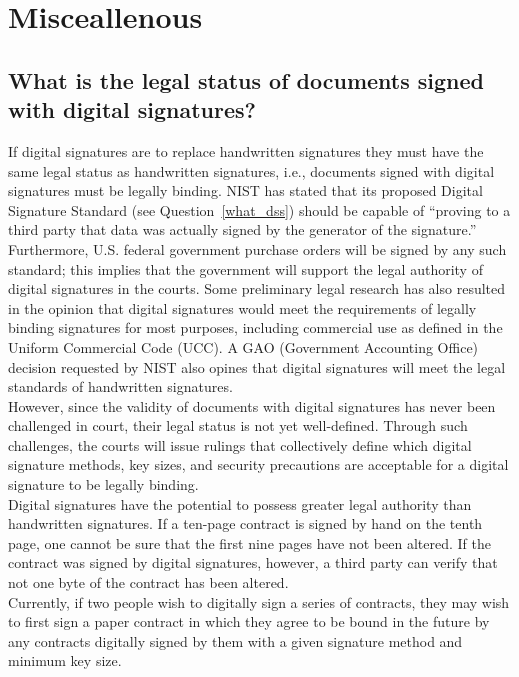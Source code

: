\section{Misceallenous}

\subsection{What is the legal status of documents signed with digital
signatures?}

If digital signatures are to replace handwritten signatures they must have
the same legal status as handwritten signatures, i.e., documents signed
with digital signatures must be legally binding. NIST has stated that its
proposed Digital Signature Standard (see Question~\ref{what_dss}) should be
capable of ``proving to a third party that data was actually signed by the
generator of the signature.'' Furthermore, U.S. federal government purchase
orders will be signed by any such standard; this implies that the
government will support the legal authority of digital signatures in the
courts. Some preliminary legal research has also resulted in the opinion
that digital signatures would meet the requirements of legally binding
signatures for most purposes, including commercial use as defined in the
Uniform Commercial Code (UCC). A GAO (Government Accounting Office)
decision requested by NIST also opines that digital signatures will meet
the legal standards of handwritten signatures.\\

However, since the validity of documents with digital signatures has
never been challenged in court, their legal status is not yet
well-defined. Through such challenges, the courts will issue rulings
that collectively define which digital signature methods, key sizes,
and security precautions are acceptable for a digital signature to be
legally binding.\\

Digital signatures have the potential to possess greater legal
authority than handwritten signatures. If a ten-page contract is signed
by hand on the tenth page, one cannot be sure that the first nine pages
have not been altered. If the contract was signed by digital
signatures, however, a third party can verify that not one byte of the
contract has been altered.\\

Currently, if two people wish to digitally sign a series of contracts,
they may wish to first sign a paper contract in which they agree to be
bound in the future by any contracts digitally signed by them with a
given signature method and minimum key size.

